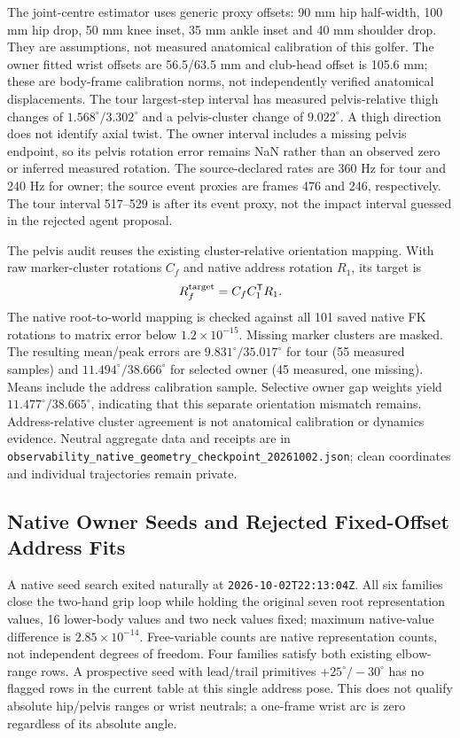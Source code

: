 \documentclass[11pt,a4paper]{article}
\begin{document}
The joint-centre estimator uses generic proxy offsets: 90 mm hip
half-width, 100 mm hip drop, 50 mm knee inset, 35 mm ankle inset and
40 mm shoulder drop. They are assumptions, not measured anatomical
calibration of this golfer. The owner fitted wrist offsets are
56.5/63.5 mm and club-head offset is 105.6 mm; these are body-frame
calibration norms, not independently verified anatomical displacements.
The tour largest-step interval has measured pelvis-relative thigh
changes of $1.568^\circ/3.302^\circ$ and a pelvis-cluster change of
$9.022^\circ$. A thigh direction does not identify axial twist.
The owner interval includes a missing pelvis endpoint, so its pelvis
rotation error remains NaN rather than an observed zero or inferred
measured rotation. The source-declared rates are 360 Hz for tour
and 240 Hz for owner; the source event proxies are frames 476 and
246, respectively. The tour interval 517--529 is after its event
proxy, not the impact interval guessed in the rejected agent proposal.

The pelvis audit reuses the existing cluster-relative orientation
mapping. With raw marker-cluster rotations $C_f$ and native address
rotation $R_1$, its target is
\[
 R_f^{\rm target}=C_f C_1^{\mathsf T}R_1.
\]
The native root-to-world mapping is checked against all 101 saved
native FK rotations to matrix error below $1.2\times10^{-15}$.
Missing marker clusters are masked. The resulting mean/peak errors
are $9.831^\circ/35.017^\circ$ for tour (55 measured samples) and
$11.494^\circ/38.666^\circ$ for selected owner (45 measured, one
missing). Means include the address calibration sample. Selective
owner gap weights yield $11.477^\circ/38.665^\circ$, indicating
that this separate orientation mismatch remains. Address-relative
cluster agreement is not anatomical calibration or dynamics evidence.
Neutral aggregate data and receipts are in
\texttt{observability\_native\_geometry\_checkpoint\_20261002.json};
clean coordinates and individual trajectories remain private.
\subsection{Native Owner Seeds and Rejected Fixed-Offset Address Fits}
A native seed search exited naturally at
\texttt{2026-10-02T22:13:04Z}. All six families close the two-hand grip
loop while holding the original seven root representation values,
16 lower-body values and two neck values fixed; maximum native-value
difference is $2.85\times10^{-14}$. Free-variable counts are native
representation counts, not independent degrees of freedom. Four
families satisfy both existing elbow-range rows. A prospective seed
with lead/trail primitives $+25^\circ/-30^\circ$ has no flagged rows
in the current table at this single address pose. This does not
qualify absolute hip/pelvis ranges or wrist neutrals; a one-frame
wrist arc is zero regardless of its absolute angle.
\end{document}
